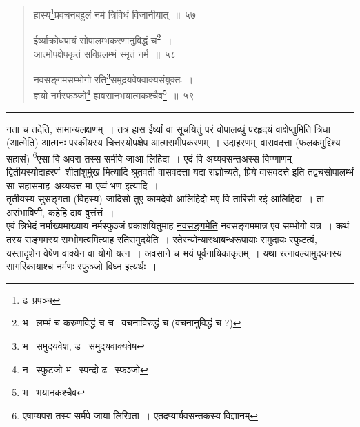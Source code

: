 \documentclass[11pt, openany]{book}
\begin{document}
\begin{quote}
{\na हास्य\renewcommand{\thefootnote}{1}\footnote{ढ\textendash\ प्रपञ्च}प्रवचनबहुलं नर्म त्रिविधं विजानीयात्~॥~५७

ईर्ष्याक्रोधप्रायं सोपालम्भकरणानुविद्धं च\renewcommand{\thefootnote}{2}\footnote{भ \textendash\ लम्भं च करुणविद्धं च च \textendash\ वचनाविरुद्धं च (वचनानुविद्धं च ?)}~।\\
आत्मोपक्षेपकृतं सविप्रलम्भं स्मृतं नर्म~॥~५८

नवसङ्गमसम्भोगो रति\renewcommand{\thefootnote}{3}\footnote{भ \textendash\ समुदयवेश, ड \textendash\ समुदयवाक्यवेष}समुदयवेषवाक्यसंयुक्तः~।\\
ज्ञयो नर्मस्फञ्जो\renewcommand{\thefootnote}{4}\footnote{न \textendash\ स्फुटजो भ \textendash\ स्पन्दो ढ \textendash\ स्फञ्जो} ह्यवसानभयात्मकश्चैव\renewcommand{\thefootnote}{5}\footnote{भ \textendash\ भयानकश्चैव}~॥~५९}
\end{quote}

\hrule

\vspace{2mm}
\noindent
नता च तदेति, सामान्यलक्षणम्~। तत्र हास ईर्ष्यां वा सूचयितुं परं वोपालब्धुं परहृदयं वाक्षेप्तुमिति त्रिधा (आत्मेति) आत्मनः परकीयस्य चित्तस्योपक्षेप आत्मसमीपकरणम्~। उदाहरणम्\textendash\ वासवदत्ता (फलकमुद्दिश्य सहासं) \renewcommand{\thefootnote}{*}\footnote{एषाप्यपरा तस्य सर्मपे जाया लिखिता~। एतदप्यार्यवसन्तकस्य विज्ञानम्}एसा वि अवरा तस्स समीवे जाआ लिहिदा~। एदं वि अय्यवसन्तअस्स विण्णाणम्~।\\

द्वितीयस्योदाहरणं\textendash\ {\qt शीतांशुर्मुख} मित्यादि श्रुतवती वासवदत्ता यदा राज्ञोच्यते, {\qt प्रिये वासवदत्ते} इति तद्वचसोपालम्भं सा सहासमाह\textendash\ {\qt अय्यउत्त मा एव्वं भण} इत्यादि~।\\

तृतीयस्य सुसङ्गता (विहस्य) {\qt जादिसो तुए कामदेवो आलिहिदो मए वि तारिसी रई आलिहिदा~। ता असंभाविणी, कहेहि दाव वुत्तंत्तं~।}\\

एवं त्रिभेदं नर्माख्यमाख्याय नर्मस्फुञ्जं प्रकाशयितुमाह \underline{नवसङ्गमेति} नवसङ्गममात्र एव सम्भोगो यत्र~। कथं तस्य सङ्गमस्य सम्भोगत्वमित्याह \underline{रतिसमुदयेति~।} रतेरन्योन्यास्थाबन्धरूपायाः समुदायः स्फुटत्वं, यस्तादृशेन वेषेण वाक्येन वा योगो यत्न~। अवसाने च भयं पूर्वनायिकाकृतम्~। यथा रत्नावल्यामुदयनस्य सागरिकायाश्च नर्मणः स्फुञ्जो विघ्न इत्यर्थः~।

\newpage
\end{document}
